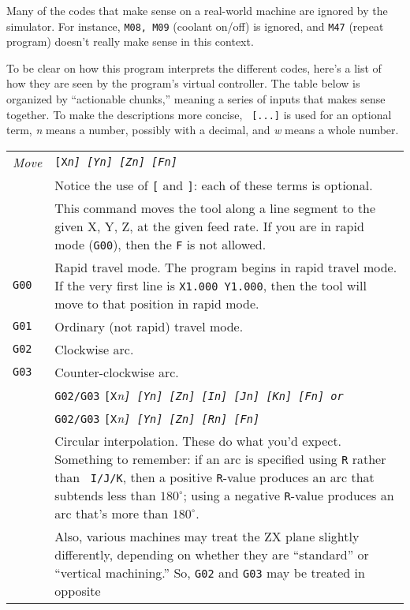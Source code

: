 \documentclass[titlepage,oneside,10pt]{article}
\begin{document}
Many of the codes that make sense on a real-world machine are
ignored by the simulator. For instance, {\tt M08, M09} (coolant
on/off) is ignored, and {\tt M47} (repeat program) doesn't really make
sense in this context.

To be clear on how this program interprets the different codes, here's
a list of how they are seen by the program's virtual controller. The
table below is organized by ``actionable chunks,'' meaning a series of inputs
that makes sense together. To make the descriptions more concise, {\tt
  [...]} is used for an optional term, \emph{n} means a number,
possibly with a decimal, and \emph{w} means a whole number.

\vskip 0.25cm
\begin{longtable}{lp{10cm}}
\em{Move} & \tt{[X}\em{n}\tt{]} \tt{[Y}\em{n}\tt{]}
\tt{[Z}\em{n}\tt{]} \tt{[F}\em{n}\tt{]} \\ 
& Notice the use of {\tt [} and {\tt ]}: each of these terms is
optional. \\
& This command moves the tool along a line segment to the given X, Y,
Z, at the given feed rate. If you are in rapid mode ({\tt G00}), then
the {\tt F} is not allowed.\\
{\tt G00}&Rapid travel mode. The program begins in rapid travel
mode. If the very first line is {\tt X1.000 Y1.000}, then the tool
will move to that position in rapid mode.\\
{\tt G01}&Ordinary (not rapid) travel mode.\\
{\tt G02}& Clockwise arc.\\
{\tt G03}&Counter-clockwise arc. \\
& {\tt G02/G03} {\tt [X}\em{n}\tt{]} \tt{[Y}\em{n}\tt{]}
\tt{[Z}\em{n}\tt{]} {\tt [I}\em{n}\tt{]} \tt{[J}\em{n}\tt{]}
\tt{[K}\em{n}\tt{]} \tt{[F}\em{n}{\tt ]} \emph{or} \\
&{\tt G02/G03} {\tt [X}\em{n}\tt{]} \tt{[Y}\em{n}\tt{]} \tt{[Z}\em{n}\tt{]}
\tt{[R}\em{n}\tt{]} \tt{[F}\em{n}\tt{]}\\
&Circular interpolation. These do what you'd expect. Something to
remember: if an arc is specified using {\tt R} rather than {\tt
  I/J/K}, then a positive {\tt R}-value produces an arc that subtends
less than $180^\circ$; using a negative {\tt R}-value produces an arc
that's more than $180^\circ$.\\
&Also, various machines may treat the ZX plane slightly
differently, depending on whether they are ``standard'' or ``vertical
machining.'' So, {\tt G02} and {\tt G03} may be treated in opposite

\end{longtable}
\end{document}
